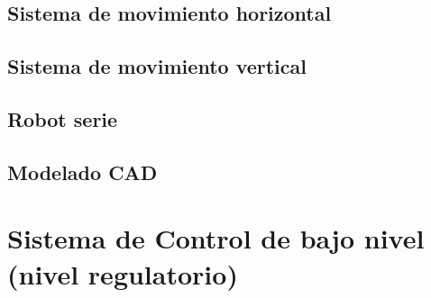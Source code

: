 \documentclass[a4paper,12pt]{report}
\begin{document}
%
%
%

%
\subsection{Sistema de movimiento horizontal}


%

\subsection{Sistema de movimiento vertical}


%

\subsection{Robot serie}

%




\subsection{Modelado CAD}
%

%

\section{Sistema de Control de bajo nivel (nivel regulatorio)}
\end{document}
